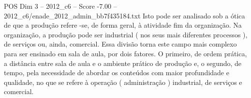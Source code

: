 \begin{textsample}{POS Dim 3 – 2012\_c6 – Score -7.00 – 2012\_c6/enade\_2012\_admin\_bb7f435184.txt}
Isto pode ser analisado sob a ótica de que a produção refere -se, de forma geral, à atividade fim da organização.
Na organização, a produção pode ser industrial ( nos seus mais diferentes processos ), de serviços ou, ainda, comercial.
Essa divisão torna este campo mais complexo para ser ensinado em sala de aula, por dois fatores.
O primeiro, de ordem prática, a distância entre sala de aula e o ambiente prático de produção e, o segundo, de tempo, pela necessidade de abordar os conteúdos com maior profundidade e qualidade, no que se refere à operação ( administração ) industrial, de serviços e comercial.

\end{textsample}
